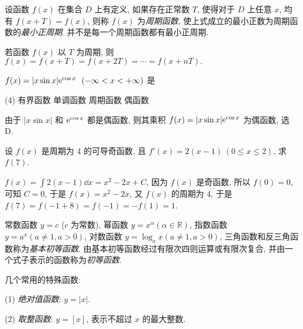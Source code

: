 \begin{definition}[周期性]
    设函数 $ f(x) $ 在集合 $ D $ 上有定义, 如果存在正常数 $ T $, 使得对于 $ D $ 上任意 $ x $, 均有 $ f(x+T)=f(x) $, 则称 $ f(x) $ 为\textit{周期函数}, 使上式成立的最小正数为周期函数的\textit{最小正周期}. 并不是每一个周期函数都有最小正周期.
\end{definition}

\begin{theorem}[函数的周期性定理]
    若函数 $f(x)$ 以 $T$ 为周期, 则 $f(x)=f(x+T)=f(x+2T)=\cdots=f(x+nT).$
\end{theorem}

\begin{example}[1987 数二]
    $f(x)=|x\sin x|\mathrm{e}^{\cos x}~~(-\infty<x<+\infty)$ 是
    \begin{tasks}(4)
        \task 有界函数
        \task 单调函数
        \task 周期函数
        \task 偶函数
    \end{tasks}
\end{example}
\begin{solution}
    由于 $|x\sin x|$ 和 $\mathrm{e}^{\cos x}$ 都是偶函数, 则其乘积 $f(x)=|x\sin x|\mathrm{e}^{\cos x}$ 为偶函数, 选 D.
\end{solution}

\begin{example}[2014 数一]
    设 $f(x)$ 是周期为 4 的可导奇函数, 且 $f'(x)=2(x-1)~ (0\leqslant x\leqslant 2)$, 求 $f(7)$.
\end{example}
\begin{solution}
    $f(x)=\displaystyle\int 2(x-1)\dd x=x^2-2x+C$, 因为 $f(x)$ 是奇函数, 所以 $f(0)=0$, 可知 $C=0$, 于是 $f(x)=x^2-2x$,
    又 $f(x)$ 的周期为 $4$, 于是 $f(7)=f(-1+8)=f(-1)=-f(1)=1$.
\end{solution}

\begin{definition}[基本初等函数与初等函数]
    常数函数 $ y=c$ ($c $ 为常数), 幂函数 $ y=x^{\alpha}(\alpha \in \mathbb{R}) $, 指数函数 $ y=a^{x}(a \neq 1, a>0) $, 对数函数 $ y=\log _{a} x(a \neq 1, a>0) $, 三角函数和反三角函数称为\textit{基本初等函数}. 由基本初等函数经过有限次四则运算或有限次复合, 并由一个式子表示的函数称为\textit{初等函数}.
\end{definition}

几个常用的特殊函数:

(1) \textit{绝对值函数}: $ y=|x|$.

(2) \textit{取整函数}: $ y=[x] $, 表示不超过 $ x $ 的最大整数.

